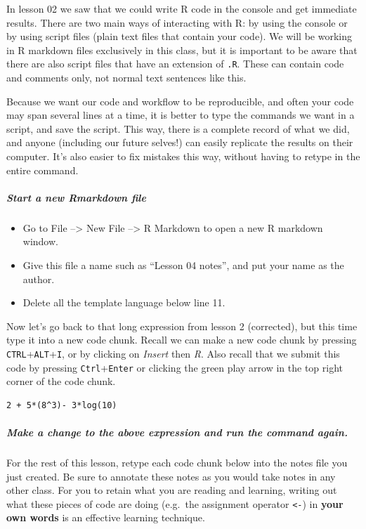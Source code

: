 \documentclass[
]{article}
\providecommand{\tightlist}{%
  \setlength{\itemsep}{0pt}\setlength{\parskip}{0pt}}
\begin{document}
In lesson 02 we saw that we could write R code in the console and get
immediate results. There are two main ways of interacting with R: by
using the console or by using script files (plain text files that
contain your code). We will be working in R markdown files exclusively
in this class, but it is important to be aware that there are also
script files that have an extension of \texttt{.R}. These can contain
code and comments only, not normal text sentences like this.

Because we want our code and workflow to be reproducible, and often your
code may span several lines at a time, it is better to type the commands
we want in a script, and save the script. This way, there is a complete
record of what we did, and anyone (including our future selves!) can
easily replicate the results on their computer. It's also easier to fix
mistakes this way, without having to retype in the entire command.

\hypertarget{start-a-new-rmarkdown-file}{%
\subparagraph{Start a new Rmarkdown
file}\label{start-a-new-rmarkdown-file}}

\begin{itemize}
\tightlist
\item
  Go to File --\textgreater{} New File --\textgreater{} R Markdown to
  open a new R markdown window.
\item
  Give this file a name such as ``Lesson 04 notes'', and put your name
  as the author.
\item
  Delete all the template language below line 11.
\end{itemize}

Now let's go back to that long expression from lesson 2 (corrected), but
this time type it into a new code chunk. Recall we can make a new code
chunk by pressing \texttt{CTRL}+\texttt{ALT}+\texttt{I}, or by clicking
on \emph{Insert} then \emph{R}. Also recall that we submit this code by
pressing \texttt{Ctrl}+\texttt{Enter} or clicking the green play arrow
in the top right corner of the code chunk.

\begin{verbatim}
2 + 5*(8^3)- 3*log(10)
\end{verbatim}

\hypertarget{make-a-change-to-the-above-expression-and-run-the-command-again.}{%
\subparagraph{Make a change to the above expression and run the command
again.}\label{make-a-change-to-the-above-expression-and-run-the-command-again.}}

For the rest of this lesson, retype each code chunk below into the notes
file you just created. Be sure to annotate these notes as you would take
notes in any other class. For you to retain what you are reading and
learning, writing out what these pieces of code are doing (e.g.~the
assignment operator \texttt{\textless{}-}) in \textbf{your own words} is
an effective learning technique.
\end{document}
